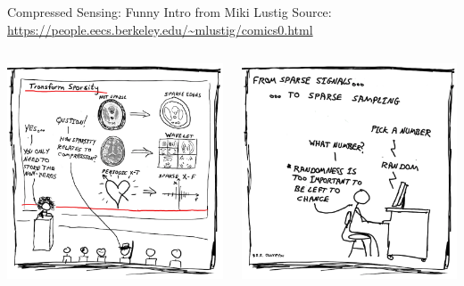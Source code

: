 \documentclass[aspectratio=169]{beamer}
\begin{document}
	\begin{frame}{Compressed Sensing: Funny Intro from Miki Lustig}
		Source: \url{https://people.eecs.berkeley.edu/~mlustig/comics0.html}
		\vspace{1em}
		\begin{columns}
			\centering
			\includegraphics[width=\columnwidth]{figures/cs-lustig-comics-13.png}
			
			\centering
			\includegraphics[width=\columnwidth]{figures/cs-lustig-comics-14.png}
		\end{columns}
	\end{frame}
	
\end{document}
